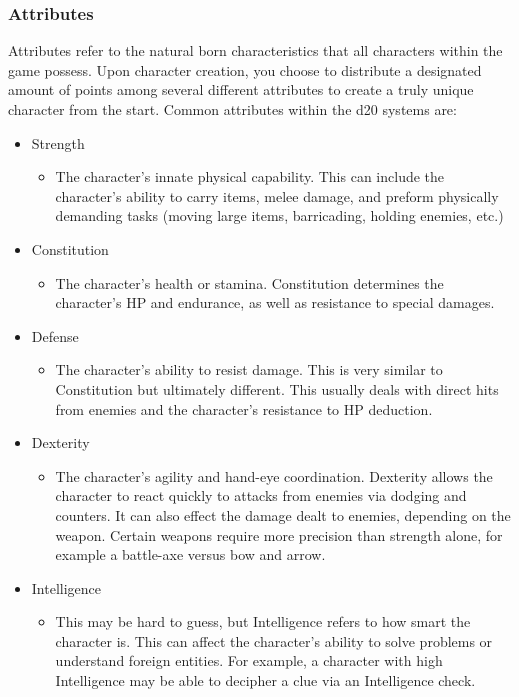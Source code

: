 \documentclass[12pt,a4paper]{report}
\begin{document}
		\subsubsection{Attributes}
			Attributes refer to the natural born characteristics that all characters within the game possess. Upon character creation, you choose to distribute a designated amount of points among several different attributes to create a truly unique character from the start. 
			Common attributes within the d20 systems are:
		\begin{itemize}
			\item Strength
			\begin{itemize}
				\item The character's innate physical capability. This can include the character's ability to carry items, melee damage, and preform physically demanding tasks (moving large items, barricading, holding enemies, etc.)
			\end{itemize}
			\item Constitution
			\begin{itemize}
				\item The character's health or stamina. Constitution determines the character's HP and endurance, as well as resistance to special damages. 
			\end{itemize}
			\item Defense
			\begin{itemize}
				\item The character's ability to resist damage. This is very similar to Constitution but ultimately different. This usually deals with direct hits from enemies and the character's resistance to HP deduction.
			\end{itemize}
			\item Dexterity
			\begin{itemize}
				\item The character's agility and hand-eye coordination. Dexterity allows the character to react quickly to attacks from enemies via dodging and counters. It can also effect the damage dealt to enemies, depending on the weapon. Certain weapons require more precision than strength alone, for example a battle-axe versus bow and arrow.
			\end{itemize}
			\item Intelligence
			\begin{itemize}
				\item This may be hard to guess, but Intelligence refers to how smart the character is. This can affect the character's ability to solve problems or understand foreign entities. For example, a character with high Intelligence may be able to decipher a clue via an Intelligence check.

\end{itemize}
\end{itemize}
\end{document}
